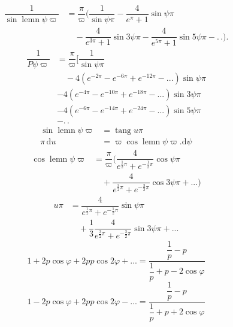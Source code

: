 \begingroup
\renewcommand{\arraystretch}{1.45}
\[
\begin{aligned}\dfrac{1}{\sin\operatorname{lemn}\psi\varpi}
&=\dfrac{\pi}{\varpi}\biggl(\dfrac{1}{\sin\psi\pi}
-\dfrac{4}{e^{\pi}+1}\sin\psi\pi
\\[7pt]&\quad{}-\dfrac{4}{e^{3\pi}+1}\sin3\psi\pi
-\dfrac{4}{e^{5\pi}+1}\sin5\psi\pi-.\,.\biggr).\end{aligned}
\]
\[
\begin{aligned}
\dfrac{1}{P\psi\varpi}
&=\dfrac{\pi}{\varpi}\biggl[\dfrac{1}{\sin\psi\pi}
\\[7pt]&\quad{}-4(e^{-2\pi}-e^{-6\pi}+e^{-12\pi}-\mathord{.}\mathord{.}\mathord{.})\sin\psi\pi\\[5pt]
&-4(e^{-4\pi}-e^{-10\pi}+e^{-18\pi}-\mathord{.}\mathord{.}\mathord{.})\sin3\psi\pi\\[5pt]
&-4(e^{-6\pi}-e^{-14\pi}+e^{-24\pi}-\mathord{.}\mathord{.}\mathord{.})\sin5\psi\pi\\[5pt]
&-.\,.
\end{aligned}
\]
\[
\begin{aligned}
\sin\operatorname{lemn}\psi\varpi&=\operatorname{tang}u\pi\\[5pt]
\pi\,\mathrm{d}u&=\varpi\cos\operatorname{lemn}\psi\varpi.\mathrm{d}\psi
\end{aligned}
\]
\[
\begin{aligned}\cos\operatorname{lemn}\psi\varpi
&=\dfrac{\pi}{\varpi}\biggl(
\dfrac{4}{e^{\frac12\pi}+e^{-\frac12\pi}}\cos\psi\pi
\\[7pt]&\quad{}+\dfrac{4}{e^{\frac32\pi}+e^{-\frac32\pi}}\cos3\psi\pi+\mathord{.}\mathord{.}\mathord{.}\biggr)\end{aligned}
\]
\[
\begin{aligned}u\pi&=\dfrac{4}{e^{\frac12\pi}+e^{-\frac12\pi}}\sin\psi\pi
\\[7pt]&\quad{}+\dfrac13\dfrac{4}{e^{\frac32\pi}+e^{-\frac32\pi}}\sin3\psi\pi+\mathord{.}\mathord{.}\mathord{.}\end{aligned}
\]
\[
1+2p\cos\varphi+2pp\cos2\varphi+\mathord{.}\mathord{.}\mathord{.}
=\dfrac{\dfrac1p-p}{\dfrac1p+p-2\cos\varphi}
\]
\[
1-2p\cos\varphi+2pp\cos2\varphi-\mathord{.}\mathord{.}\mathord{.}
=\dfrac{\dfrac1p-p}{\dfrac1p+p+2\cos\varphi}
\]
